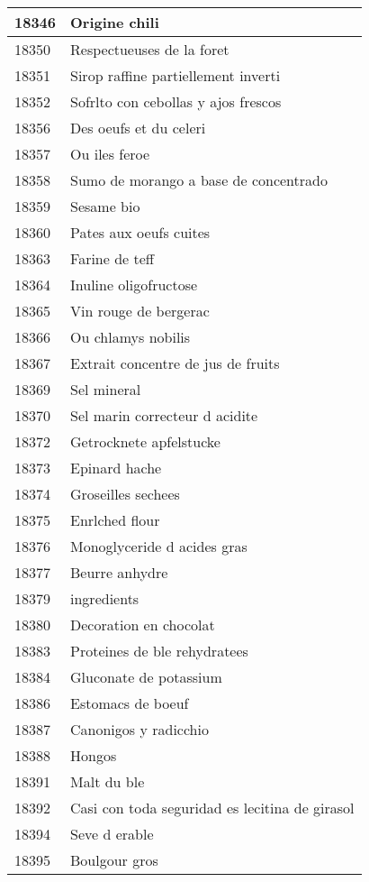 \begin{longtable}{|l|l|}
18346 & Origine chili \\ \hline 
18350 & Respectueuses de la foret \\ \hline 
18351 & Sirop raffine partiellement inverti \\ \hline 
18352 & Sofrlto con cebollas y ajos frescos \\ \hline 
18356 & Des oeufs et du celeri \\ \hline 
18357 & Ou iles feroe \\ \hline 
18358 & Sumo de morango a base de concentrado \\ \hline 
18359 & Sesame bio \\ \hline 
18360 & Pates aux oeufs cuites \\ \hline 
18363 & Farine de teff \\ \hline 
18364 & Inuline oligofructose \\ \hline 
18365 & Vin rouge de bergerac \\ \hline 
18366 & Ou chlamys nobilis \\ \hline 
18367 & Extrait concentre de jus de fruits \\ \hline 
18369 & Sel mineral \\ \hline 
18370 & Sel marin correcteur d acidite \\ \hline 
18372 & Getrocknete apfelstucke \\ \hline 
18373 & Epinard hache \\ \hline 
18374 & Groseilles sechees \\ \hline 
18375 & Enrlched flour \\ \hline 
18376 & Monoglyceride d acides gras \\ \hline 
18377 & Beurre anhydre \\ \hline 
18379 & ingredients \\ \hline 
18380 & Decoration en chocolat \\ \hline 
18383 & Proteines de ble rehydratees \\ \hline 
18384 & Gluconate de potassium \\ \hline 
18386 & Estomacs de boeuf \\ \hline 
18387 & Canonigos y radicchio \\ \hline 
18388 & Hongos \\ \hline 
18391 & Malt du ble \\ \hline 
18392 & Casi con toda seguridad es lecitina de girasol \\ \hline 
18394 & Seve d erable \\ \hline 
18395 & Boulgour gros \\ \hline 

\end{longtable}
